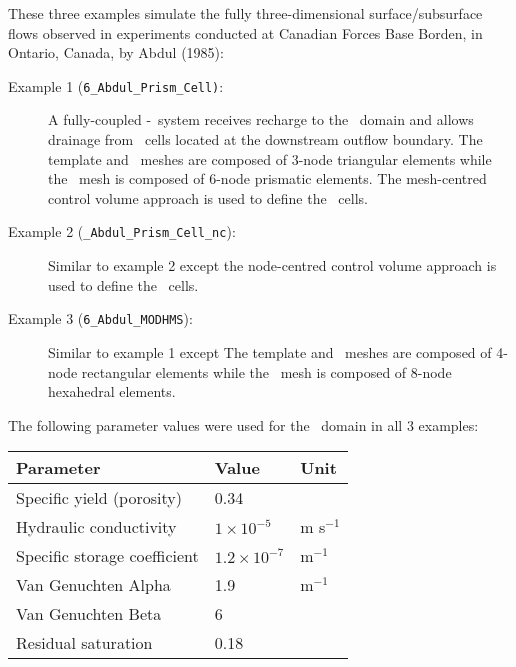 \label{section:3D_Example_Abdul}
These three examples simulate the fully three-dimensional surface/subsurface flows observed in  experiments conducted at Canadian Forces Base Borden, in Ontario, Canada, by Abdul (1985):
\begin{description}
    \item [Example 1 (\texttt{6\_Abdul\_Prism\_Cell)}:] A fully-coupled \gwf-\swf\ system receives recharge to the \swf\ domain and allows drainage from \swf\ cells located at the downstream outflow boundary.
        The template and \swf\ meshes are composed of 3-node triangular elements while the \gwf\ mesh is composed of 6-node prismatic elements.  The mesh-centred control volume approach is used to define the \mfus\ cells.
    \item [Example 2 (\texttt{\_Abdul\_Prism\_Cell\_nc}):] Similar to example 2 except the node-centred control volume approach is used to define the \mfus\ cells.
    \item [Example 3 (\texttt{6\_Abdul\_MODHMS}):] Similar to example 1 except The template and \swf\ meshes are composed of 4-node rectangular elements while the \gwf\ mesh is composed of 8-node hexahedral elements.
\end{description}

The following parameter values were used for the \gwf\ domain in all 3 examples:

\begin{center}
    \begin{tabular}{lll}  \hline
        Parameter                             & Value                       &     Unit                                \\ \hline
        Specific yield (porosity)             &  0.34                       &                   \\
        Hydraulic conductivity                &  $ 1 \times 10^{-5}$        &     m s$^{-1}$    \\
        Specific storage coefficient          &  $ 1.2 \times 10^{-7}$      &     m$^{-1}$      \\
        Van Genuchten Alpha                   &  1.9                        &     m$^{-1}$      \\
        Van Genuchten Beta                    &  6                          &                   \\
        Residual saturation                   &  0.18                     &                   \\
    \hline
    \end{tabular}
\end{center}

